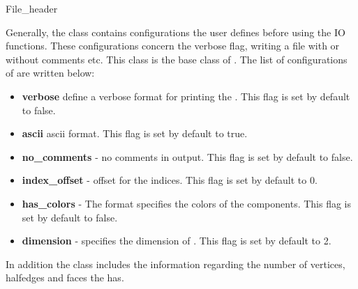 
\ccRefPageBegin


\begin{ccRefClass}{File_header}


\ccDefinition
Generally, the \ccRefName class contains configurations the user defines before using the IO functions.
These configurations concern the verbose flag, writing a file with or without comments etc.
This class is the base class of  .
The list of configurations of \ccRefName are written below:

\begin{itemize}
\item {\bf verbose } define a verbose format for printing the . This flag is set by default to false.
\item {\bf ascii} ascii format. This flag is set by default to true.
\item {\bf no\_comments} - no comments in output. This flag is set by default to false.
\item {\bf index\_offset} - offset for the indices. This flag is set by default to 0.
\item {\bf has\_colors} - The format specifies the colors of the  components. This flag is set by default to false.
\item {\bf dimension} - specifies the dimension of . This flag is set by default to 2.
\end{itemize}

In addition the \ccRefName class includes the information regarding the number of vertices, halfedges and faces the 
 has.




\end{ccRefClass}
